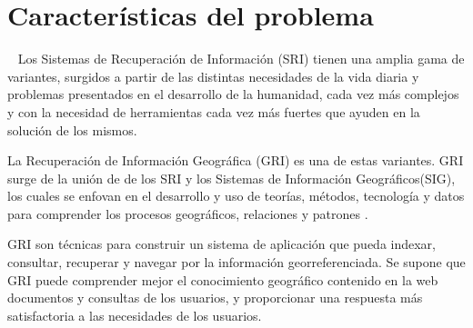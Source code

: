 \section{Características del problema}\label{sec:prob-charact}

~
Los Sistemas de Recuperación de Información (SRI) tienen una amplia gama de
variantes, surgidos a partir de las distintas necesidades de la vida diaria y
problemas presentados en el desarrollo de la humanidad, cada vez más complejos
y con la necesidad de herramientas cada vez más fuertes que ayuden en la
solución de los mismos. 

La Recuperación de Información Geográfica (GRI) es una de estas variantes. GRI
surge de la unión de de los SRI y los Sistemas de Información Geográficos(SIG),
los cuales se enfovan en el desarrollo y uso de teorías, métodos, tecnología y
datos para comprender los procesos geográficos, relaciones y patrones
\cite{chang2016}.

GRI son técnicas para construir un sistema de aplicación que pueda indexar,
consultar, recuperar y navegar por la información georreferenciada. Se supone
que GRI puede comprender mejor el conocimiento geográfico contenido en la web
documentos y consultas de los usuarios, y proporcionar una respuesta más satisfactoria a las necesidades de los usuarios.

